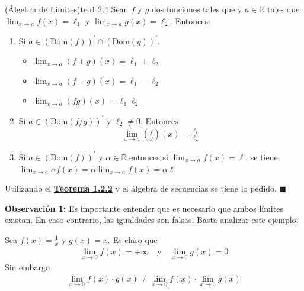 \documentclass[12pt]{book}
\renewenvironment{proof}[1][\textit{Demostración}]{%
  \par\noindent{\bfseries #1.}\enspace}{\hfill$\blacksquare$\par}
\begin{document}
\begin{teo}{(Álgebra de Límites)}{teo1.2.4}
    Sean $f$ y $g$ dos funciones tales que  y $a \in \mathbb{R}$  tales que $\displaystyle \lim_{x \to a}f(x)=\ell_1$ y $\displaystyle \lim_{x\to a}g(x)=\ell_2$.  Entonces:
    \begin{enumerate}
        \item  
        Si  $ a \in (\text{Dom}(f))^{\prime}\cap (\text{Dom}(g))^{\prime}$.
        \begin{itemize}
            \item $\displaystyle \lim_{x \to a }(f+g)(x)=\ell_1 + \ell_2$ 
            \item  $\displaystyle \lim_{x \to a }(f-g)(x)=\ell_1 - \ell_2$ 
            \item  $\displaystyle \lim_{x \to a }(fg)(x)=\ell_1  \ell_2$ 
        \end{itemize}
       

        \item Si $a \in (\text{Dom}(f/g))^{\prime}$ y $\ell_2\neq0$. Entonces
        \begin{align*}
            \lim_{x\to a }\left(\frac{f}{g}\right)(x)=\frac{\ell_1}{\ell_2}
        \end{align*}

        \item Si  $a \in (\text{Dom}(f))^{\prime}$ y $\alpha \in \mathbb{R}$ entonces si $ \displaystyle\lim_{x \to a }f(x)=\ell$, se tiene  $ \displaystyle\lim_{x \to a }\alpha f(x)=\alpha \lim_{x \to a }f(x)=\alpha \ell$
    \end{enumerate}
\end{teo}
\begin{proof}
    Utilizando el \hyperref[th:teo:criteriosecuencial]{\textbf{Teorema 1.2.2}} y el álgebra de secuencias se tiene lo pedido.
\end{proof}

\vspace{0.5cm}

\textbf{Observación 1:} Es importante entender que es necesario que ambos límites existan. En caso contrario, las igualdades son falsas. Basta analizar este ejemplo:

Sea $f(x)=\frac{1}{x}$ y $g(x)=x$. Es claro que 
\begin{align*}
    \lim_{x \to 0}f(x)=+\infty \quad \text{y} \quad \lim_{x \to 0}g(x)=0
\end{align*}
Sin embargo
\begin{align*}
    \lim_{x\to 0}f(x)\cdot g(x) \neq  \lim_{x\to 0}f(x)\cdot  \lim_{x\to 0}g(x)
\end{align*}
\end{document}

